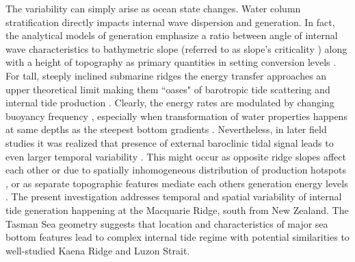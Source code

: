 \documentclass[12pt]{article}
\begin{document}
The variability can simply arise as ocean state changes. Water column stratification directly 
impacts internal wave dispersion and generation. In fact, the analytical models of generation 
emphasize a ratio between angle of internal wave characteristics to bathymetric slope (referred to 
as slope's criticality \citep{sutherland2010internal, garrett2007internal}) along with a height of 
topography as primary 
quantities in setting conversion levels \citep{llewellyn2003tidal, petrelis2006tidal}. For tall, 
steeply inclined submarine ridges the energy transfer approaches an upper theoretical limit 
\citep{petrelis2006tidal, st2003generation} making them ``oases" of barotropic tide 
scattering and internal tide production \citep{morozov1995semidiurnal, egbert2000significant}. 
Clearly, the energy rates are modulated by changing buoyancy frequency 
\citep{holloway1999internal}, especially when transformation of water properties happens at same 
depths as the steepest bottom gradients \citep{gerkema2004internal}. Nevertheless, in later field 
studies it was realized that presence of external baroclinic tidal signal leads to even larger 
temporal variability \citep{Kelly2010a, zilberman2011incoherent, pickering2015structure}. This 
might occur as opposite ridge slopes affect each other \citep{nash2004internal, 
zilberman2011incoherent, echeverri2010internal} or due to spatially inhomogeneous distribution of 
production hotspots \citep{osborne2011spatial, ponte2013coastal}, or as separate topographic 
features mediate each others generation energy levels \citep{xing1998three, buijsman2012modeling, 
klymak2013parameterizing, buijsman2014three}. The present investigation addresses 
temporal and spatial variability of internal tide generation happening at the Macquarie Ridge, 
south from 
New Zealand. The Tasman Sea geometry  suggests that 
location and characteristics of major sea bottom features lead to complex internal tide regime with 
potential similarities to well-studied Kaena Ridge and Luzon Strait.\\
\end{document}
